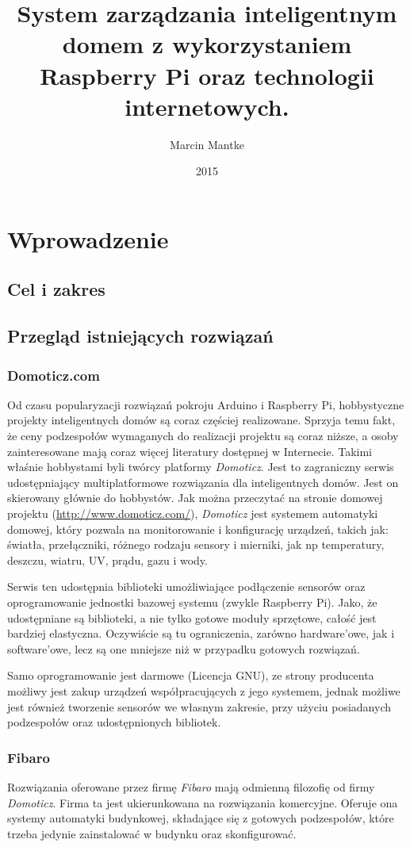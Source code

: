 \documentclass[eng,oneside]{mgr}
\author{Marcin Mantke}
\title{System zarządzania inteligentnym domem z wykorzystaniem Raspberry Pi oraz technologii internetowych.}
\date{2015}
\begin{document}
\maketitle
\tableofcontents
\chapter{Wprowadzenie}
\section{Cel i zakres}
\section{Przegląd istniejących rozwiązań}
\subsection{Domoticz.com}
Od czasu popularyzacji rozwiązań pokroju Arduino i Raspberry Pi, hobbystyczne projekty inteligentnych domów są coraz częściej realizowane. Sprzyja temu fakt, że ceny podzespołów wymaganych do realizacji projektu są coraz niższe, a osoby zainteresowane mają coraz więcej literatury dostępnej w Internecie. Takimi właśnie hobbystami byli twórcy platformy \textit{Domoticz}. Jest to zagraniczny serwis udostępniający multiplatformowe rozwiązania dla inteligentnych domów. Jest on skierowany głównie do hobbystów. Jak można przeczytać na stronie domowej projektu (\url{http://www.domoticz.com/}), \textit{Domoticz} jest systemem automatyki domowej, który pozwala na monitorowanie i konfigurację urządzeń, takich jak: światła, przełączniki, różnego rodzaju sensory i mierniki, jak np temperatury, deszczu, wiatru, UV, prądu, gazu i wody.

Serwis ten udostępnia biblioteki umożliwiające podłączenie sensorów oraz oprogramowanie jednostki bazowej systemu (zwykle Raspberry Pi). Jako, że udostępniane są biblioteki, a nie tylko gotowe moduły sprzętowe, całość jest bardziej elastyczna. Oczywiście są tu ograniczenia, zarówno hardware'owe, jak i software'owe, lecz są one mniejsze niż w przypadku gotowych rozwiązań.

Samo oprogramowanie jest darmowe (Licencja GNU), ze strony producenta możliwy jest zakup urządzeń współpracujących z jego systemem, jednak możliwe jest również tworzenie sensorów we własnym zakresie, przy użyciu posiadanych podzespołów oraz udostępnionych bibliotek.
\subsection{Fibaro}                                                                                              
Rozwiązania oferowane przez firmę \textit{Fibaro} mają odmienną filozofię od firmy \textit{Domoticz}. Firma ta jest ukierunkowana na rozwiązania komercyjne. Oferuje ona systemy automatyki budynkowej, składające się z gotowych podzespołów, które trzeba jedynie zainstalować w budynku oraz skonfigurować.
\end{document}
